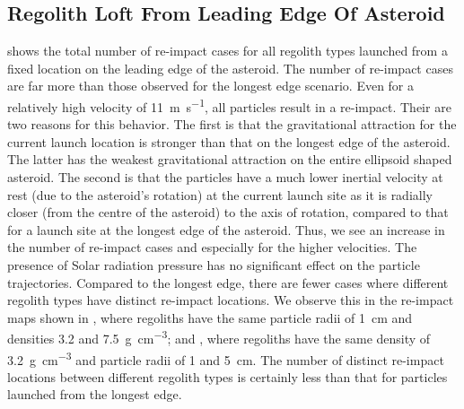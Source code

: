 \subsection{Regolith Loft From Leading Edge Of Asteroid}
\label{sec:general_char_leadingEdge}
 shows the total number of re-impact cases for all regolith types launched from a fixed location on the leading edge of the asteroid. The number of re-impact cases are far more than those observed for the longest edge scenario. Even for a relatively high velocity of \SI{11}{\metre\per\second}, all particles result in a re-impact. Their are two reasons for this behavior. The first is that the gravitational attraction for the current launch location is stronger than that on the longest edge of the asteroid. The latter has the weakest gravitational attraction on the entire ellipsoid shaped asteroid. The second is that the particles have a much lower inertial velocity at rest (due to the asteroid's rotation) at the current launch site as it is radially closer (from the centre of the asteroid) to the axis of rotation, compared to that for a launch site at the longest edge of the asteroid. Thus, we see an increase in the number of re-impact cases and especially for the higher velocities.
%
\newline\newline
%
The presence of Solar radiation pressure has no significant effect on the particle trajectories. Compared to the longest edge, there are fewer cases where different regolith types have distinct re-impact locations. We observe this in the re-impact maps shown in , where regoliths have the same particle radii of \SI{1}{\centi\metre} and densities 3.2 and \SI{7.5}{\gram\per\centi\metre\cubed}; and , where regoliths have the same density of \SI{3.2}{\gram\per\centi\metre\cubed} and particle radii of 1 and \SI{5}{\centi\metre}. The number of distinct re-impact locations between different regolith types is certainly less than that for particles launched from the longest edge.
